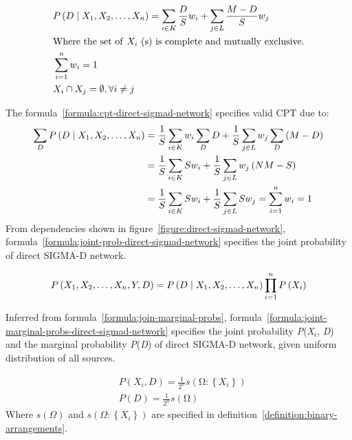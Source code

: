 \documentclass{article}
\numberwithin{equation}{section}
\numberwithin{figure}{section}
\numberwithin{table}{section}
\begin{document}
\begin{equation}
\begin{split}
&P\left(D\mathrel{\left|\vphantom{D X_1,X_2,\dots ,X_n}\right.\kern-\nulldelimiterspace}X_1,X_2,\dots ,X_n\right)=\sum_{i\in K}{\frac{D}{S}w_i}+\sum_{j\in L}{\frac{M-D}{S}w_j}\\
&\mathrm{Where}\ \mathrm{the}\ \mathrm{set}\ \mathrm{of}\ X_i\ \mathrm{(s)}\ \mathrm{is}\ \mathrm{complete}\ \mathrm{and}\ \mathrm{mutually}\ \mathrm{exclusive.}\\
&\sum^n_{i=1}{w_i}=1\\
&X_i\cap X_j=\emptyset ,\forall i\neq j
\end{split}
\label{formula:cpt-direct-sigmad-network}
\end{equation}

The formula~\ref{formula:cpt-direct-sigmad-network} specifies valid CPT due to:
\begin{align*}
\sum_D{P\left(D\mathrel{\left|\vphantom{D X_1,X_2,\dots ,X_n}\right.\kern-\nulldelimiterspace}X_1,X_2,\dots ,X_n\right)}&=\frac{1}{S}\sum_{i\in K}{w_i\sum_D{D}}+\frac{1}{S}\sum_{j\in L}{w_j\sum_D{\left(M-D\right)}}\\
&=\frac{1}{S}\sum_{i\in K}{Sw_i}+\frac{1}{S}\sum_{j\in L}{w_j\left(NM-S\right)}\\
&=\frac{1}{S}\sum_{i\in K}{Sw_i}+\frac{1}{S}\sum_{j\in L}{Sw_j}=\sum^n_{i=1}{w_i}=1
\end{align*}
From dependencies shown in figure~\ref{figure:direct-sigmad-network}, formula~\ref{formula:joint-prob-direct-sigmad-network} specifies the joint probability of direct SIGMA-D network.

\begin{equation}
P\left(X_1,X_2,\dots ,X_n,Y,D\right)=P\left(D\mathrel{\left|\vphantom{D X_1,X_2,\dots ,X_n}\right.\kern-\nulldelimiterspace}X_1,X_2,\dots ,X_n\right)\prod^n_{i=1}{P\left(X_i\right)}
\label{formula:joint-prob-direct-sigmad-network}
\end{equation}

Inferred from formula~\ref{formula:join-marginal-probs}, formula~\ref{formula:joint-marginal-probs-direct-sigmad-network} specifies the joint probability \textit{P}(\textit{X${}_{i}$}, \textit{D}) and the marginal probability \textit{P}(\textit{D}) of direct SIGMA-D network, given uniform distribution of all sources.

\begin{equation}
\begin{split}
&P\left(X_i,D\right)=\frac{1}{2^n}s\left(\mathrm{\Omega }\mathrm{:}\left\{X_i\right\}\right)\\
&P\left(D\right)=\frac{1}{2^n}s\left(\mathrm{\Omega }\right)
\end{split}
\label{formula:joint-marginal-probs-direct-sigmad-network}
\end{equation}
Where $s\left(\Omega\right)$ and $s\left(\Omega:\left\{X_i\right\}\right)$ are specified in definition~\ref{definition:binary-arrangements}.
\end{document}
